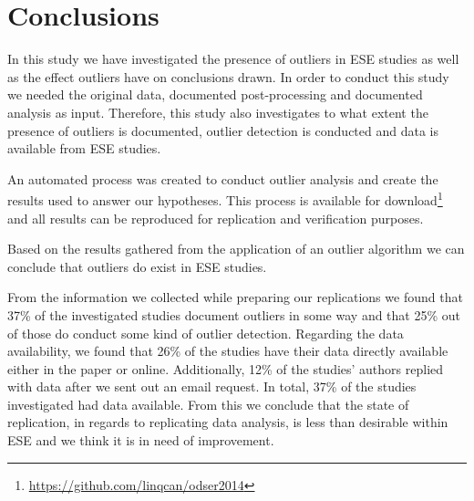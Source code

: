 ﻿\section{Conclusions}
\label{sec:conclusions}
In this study we have investigated the presence of outliers in ESE studies as well as the effect outliers have on conclusions drawn. In order to conduct this study we needed the original data, documented post-processing and documented analysis as input. Therefore, this study also investigates to what extent the presence of outliers is documented, outlier detection is conducted and data is available from ESE studies.




An automated process was created to conduct outlier analysis and create the results used to answer our hypotheses. This process is available for download\footnote{\url{https://github.com/linqcan/odser2014}} and all results can be reproduced for replication and verification purposes.




Based on the results gathered from the application of an outlier algorithm we can conclude that outliers do exist in ESE studies. 




From the information we collected while preparing our replications we found that 37\% of the investigated studies document outliers in some way and that 25\% out of those do conduct some kind of outlier detection. Regarding the data availability, we found that 26\% of the studies have their data directly available either in the paper or online. Additionally, 12\% of the studies' authors replied with data after we sent out an email request. In total, 37\% of the studies investigated had data available. From this we conclude that the state of replication, in regards to replicating data analysis, is less than desirable within ESE and we think it is in need of improvement.




